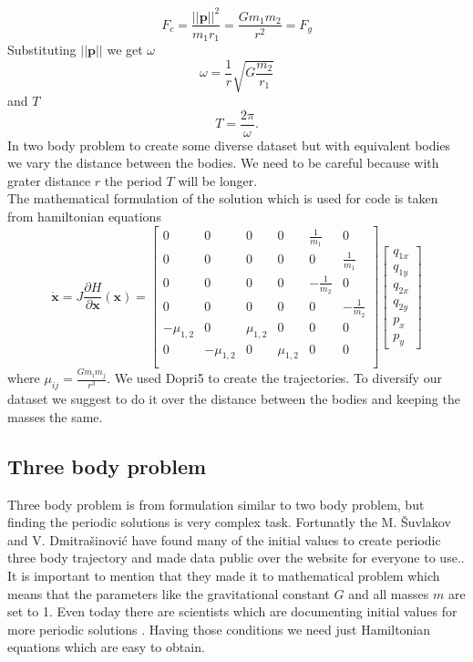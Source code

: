 \begin{equation}
	F_c = \frac{||\mathbf{p}||^2}{m_1r_1} = \frac{Gm_1m_2}{r^2} = F_g
\end{equation}
Substituting $||\mathbf{p}||$ we get $\omega$
\begin{equation}
	\omega = \frac{1}{r}\sqrt{G\frac{m_2}{r_1}}
\end{equation} and $T$
 \begin{equation}
 	T = \frac{2\pi}{\omega}.
 \end{equation}
In two body problem to create some diverse dataset but with equivalent bodies we vary the distance between the bodies. We need to be careful because with grater distance $r$ the period $T$ will be longer.\\
The mathematical formulation of the solution which is used for code is taken from hamiltonian equations
\begin{equation}
	\dot{\mathbf{x}} = J\frac{\partial H}{\partial \mathbf{x}}(\mathbf{x})=
\begin{bmatrix}
	0 & 0 & 0 & 0 & \frac{1}{m_1} & 0\\
	0 & 0 & 0 & 0 & 0 & \frac{1}{m_1}\\
	0 & 0 & 0 & 0 & -\frac{1}{m_2} & 0\\
	0 & 0 & 0 & 0 & 0 & -\frac{1}{m_2}\\
	-\mu_{1,2} & 0 & \mu_{1,2} & 0 & 0 & 0 \\
	0 & -\mu_{1,2} & 0 & \mu_{1,2} & 0 & 0 \\
\end{bmatrix}
\begin{bmatrix}
	q_{1x}\\
	q_{1y}\\
	q_{2x}\\
	q_{2y}\\
	p_x\\
	p_y
\end{bmatrix} 
\end{equation} where $\mu_{ij}=\frac{Gm_im_j}{r^3}.$
We used Dopri5 to create the trajectories. To diversify our dataset we suggest to do it over the distance between the bodies and keeping the masses the same.

\subsection{Three body problem}
Three body problem is from formulation similar to two body problem, but finding the periodic solutions is very complex task. Fortunatly the M. Šuvlakov and V. Dmitrašinović have found many of the initial values to create periodic three body trajectory and made data public over the website for everyone to use.\cite{papthreebody}\cite{web}. It is important to mention that they made it to mathematical problem which means that the parameters like the gravitational constant $G$ and all masses $m$ are set to 1.
Even today there are scientists which are documenting initial values for more periodic solutions \cite{hudomal2015new}.
Having those conditions we need just Hamiltonian equations which are easy to obtain. 


